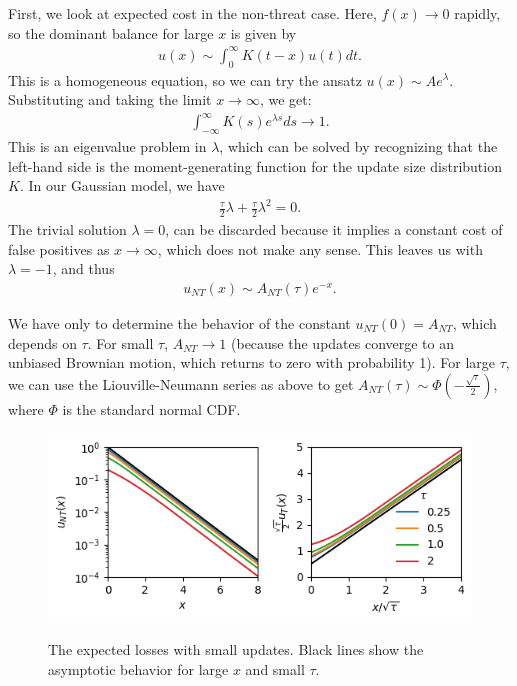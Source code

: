 \documentclass[12pt, letterpaper]{article}
\begin{document}
First, we look at expected cost in the non-threat case.
Here, $f(x) \to 0$ rapidly, so the dominant balance for large $x$ is given by
\begin{align}
    u(x) \sim \int_0^{\infty} K(t - x) u(t) dt.
\end{align}
This is a homogeneous equation, so we can try the ansatz $u(x) \sim A e^{\lambda}$.
Substituting and taking the limit $x \to \infty$, we get:
\begin{align}
    \int_{-\infty}^{\infty} K(s) e^{\lambda s} ds \to 1.
\end{align}
This is an eigenvalue problem in $\lambda$, which can be solved by recognizing that the left-hand side is the moment-generating function for the update size distribution $K$.
In our Gaussian model, we have
\begin{align}
    \frac{\tau}{2} \lambda + \frac{\tau}{2} \lambda^2 = 0.
\end{align}
The trivial solution $\lambda = 0$, can be discarded because it implies a constant cost of false positives as $x\to \infty$, which does not make any sense.
This leaves us with $\lambda = -1$, and thus
\begin{align}
    u_{NT}(x) \sim A_{NT}(\tau) e^{-x}.
\end{align}

We have only to determine the behavior of the constant $u_{NT}(0) = A_{NT}$, which depends on $\tau$.
For small $\tau$, $A_{NT} \to 1$ (because the updates converge to an unbiased Brownian motion, which returns to zero with probability 1).
For large $\tau$, we can use the Liouville-Neumann series as above to get $A_{NT}(\tau) \sim \Phi(-\frac{\sqrt{\tau}}{2})$, where $\Phi$ is the standard normal CDF.

\begin{figure}
    \centering
    \includegraphics{small_updates}
    \label{fig:small_updates}
    \caption{The expected losses with small updates. Black lines show the asymptotic behavior for large $x$ and small $\tau$.}
\end{figure}
\end{document}
